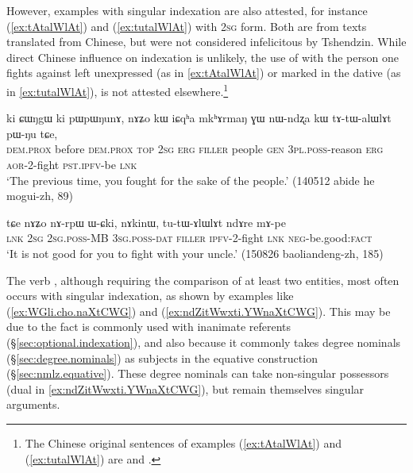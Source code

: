 However, examples with singular indexation are also attested, for instance (\ref{ex:tAtalWlAt}) and (\ref{ex:tutalWlAt}) with \textsc{2sg} form. Both are from texts translated from Chinese, but were not considered infelicitous by Tshendzin. While direct Chinese influence on indexation is unlikely, the use of  with the person one fights against left unexpressed (as in \ref{ex:tAtalWlAt}) or marked in the dative (as in \ref{ex:tutalWlAt}), is not attested elsewhere.\footnote{The Chinese original sentences of examples (\ref{ex:tAtalWlAt}) and (\ref{ex:tutalWlAt}) are  and .  } 

\begin{exe}
\ex   \label{ex:tAtalWlAt}
 \gll  ki ɕɯŋgɯ ki pɯpɯŋunɤ, nɤʑo kɯ iɕqʰa mkʰɤrmaŋ ɣɯ nɯ-ndʐa kɯ tɤ-tɯ-alɯlɤt pɯ-ŋu tɕe, \\
 \textsc{dem}.\textsc{prox} before \textsc{dem}.\textsc{prox} \textsc{top} \textsc{2sg} \textsc{erg} \textsc{filler} people \textsc{gen} \textsc{3pl}.\textsc{poss}-reason \textsc{erg} \textsc{aor}-2-fight \textsc{pst}.\textsc{ipfv}-be \textsc{lnk} \\
\glt `The previous time, you fought for the sake of the people.' (140512 abide he mogui-zh, 89)
 \end{exe}

\begin{exe}
\ex   \label{ex:tutalWlAt}
 \gll  tɕe nɤʑo nɤ-rpɯ ɯ-ɕki, nɤkinɯ, tu-tɯ-ɤlɯlɤt ndɤre mɤ-pe \\
 \textsc{lnk} \textsc{2sg} \textsc{2sg}.\textsc{poss}-MB \textsc{3sg}.\textsc{poss}-\textsc{dat} \textsc{filler} \textsc{ipfv}-2-fight \textsc{lnk} \textsc{neg}-be.good:\textsc{fact} \\
 \glt `It is not good for you to fight with your uncle.' (150826 baoliandeng-zh, 185)
  \end{exe}
  
The verb , although requiring the comparison of at least two entities, most often occurs with singular indexation, as shown by examples like (\ref{ex:WGli.cho.naXtCWG}) and (\ref{ex:ndZitWwxti.YWnaXtCWG}). This may be due to the fact  is commonly used with inanimate referents (§\ref{sec:optional.indexation}), and also because it commonly takes degree nominals  (§\ref{sec:degree.nominals}) as subjects in the equative construction (§\ref{sec:nmlz.equative}). These degree nominals can take non-singular possessors (dual in \ref{ex:ndZitWwxti.YWnaXtCWG}), but remain themselves singular arguments.

